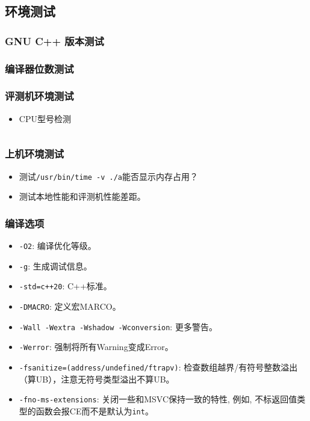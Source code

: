 \documentclass[a4paper, twoside]{article}
\begin{document}
\subsection{环境测试}
    \subsubsection{GNU C++ 版本测试}

    \subsubsection{编译器位数测试}

    \subsubsection{评测机环境测试}
    \begin{itemize}
        \item CPU型号检测
        \inputminted{cpp}{../src/附录/环境测试/CPU型号检测.cpp}
    \end{itemize}

    \subsubsection{上机环境测试}
    \begin{itemize}
        \item 测试\texttt{/usr/bin/time -v ./a}能否显示内存占用？
        \item 测试本地性能和评测机性能差距。
    \end{itemize}

    \subsubsection{编译选项}
    \begin{itemize}
        \item \texttt{-O2}: 编译优化等级。
        \item \texttt{-g}: 生成调试信息。
        \item \texttt{-std=c++20}: C++标准。
        \item \texttt{-DMACRO}: 定义宏MARCO。
        \item \texttt{-Wall -Wextra -Wshadow -Wconversion}: 更多警告。
        \item \texttt{-Werror}: 强制将所有Warning变成Error。
        \item \texttt{-fsanitize=(address/undefined/ftrapv)}: 检查数组越界/有符号整数溢出（算UB），注意无符号类型溢出不算UB。
        \item \texttt{-fno-ms-extensions}: 关闭一些和MSVC保持一致的特性, 例如, 不标返回值类型的函数会报CE而不是默认为\texttt{int}。
    \end{itemize}
\end{document}
